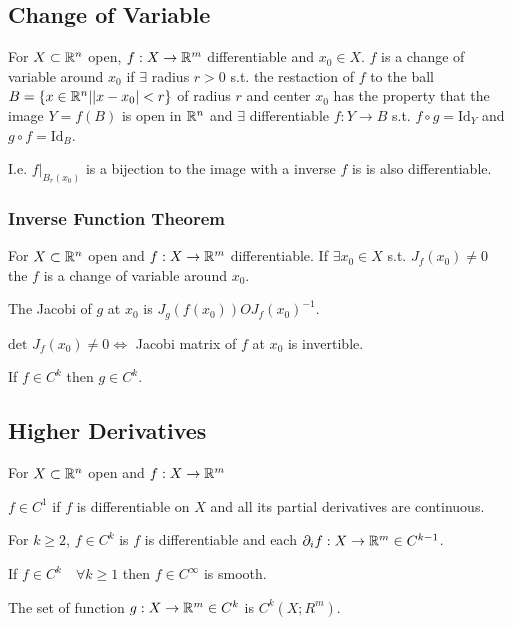 \subsection{Change of Variable}
For $X \subset \mathbb{R}^n$ open, $f: X \to \mathbb{R}^m$ differentiable and $x_0 \in X$. $f$ is a change of variable around $x_0$ if $\exists$ radius $r > 0$ s.t. the restaction of $f$ to the ball $B = \{x \in \mathbb{R}^n | |x - x_0| < r\}$ of radius $r$ and center $x_0$ has the property that the image $Y = f(B)$ is open in $\mathbb{R}^n$ and $\exists$ differentiable $f: Y \to B$ s.t. $f \circ g = \text{Id}_Y$ and $g \circ f = \text{Id}_B$.

\begin{compactitem}
    \item I.e. $f|_{B_r(x_0)}$ is a bijection to the image with a inverse $f$ is is also differentiable.
\end{compactitem}

\subsubsection{Inverse Function Theorem}
For $X \subset \mathbb{R}^n$ open and $f: X \to \mathbb{R}^m$ differentiable. If $\exists x_0 \in X$ s.t. $J_f(x_0) \neq 0$ the $f$ is a change of variable around $x_0$.

\begin{compactitem}
    \item The Jacobi of $g$ at $x_0$ is $J_g(f(x_0)) O J_f(x_0)^{-1}$.
    \item $\text{det }J_f(x_0) \neq 0 \iff$ Jacobi matrix of $f$ at $x_0$ is invertible.
    \item If $f \in C^k$ then $g \in C^k$.
\end{compactitem}

\subsection{Higher Derivatives}
For $X \subset \mathbb{R}^n$ open and $f: X \to \mathbb{R}^m$
\begin{compactitem}
    \item $f \in C^1$ if $f$ is differentiable on $X$ and all its partial derivatives are continuous.
    \item For $k \ge 2$, $f \in C^k$ is $f$ is differentiable and each $\partial_i f: X \to \mathbb{R}^m \in C^{k-1}$.
    \item If $f \in C^k \quad \forall k \ge 1$ then $f \in C^\infty$ is smooth.
    \item The set of function $g: X \to \mathbb{R}^m \in C^k$ is $C^k(X; R^m)$.
\end{compactitem}


